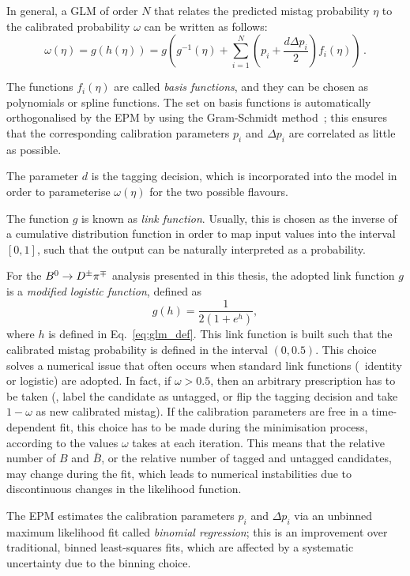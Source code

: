 In general, a GLM of order $N$ that relates the predicted mistag probability $\eta$ to the 
calibrated probability $\omega$ can be written as follows:
\begin{equation}
  \label{eq:glm_def}
  \omega(\eta) = g(h(\eta)) = g \left( g^{-1} (\eta) + \sum\limits_{i=1}^{N} \left(p_i + \frac{d\Delta p_i}{2}\right)f_i(\eta)\right)\,.
\end{equation}

The functions $f_i(\eta)$ are called \emph{basis functions}, and they can be chosen as polynomials or spline functions.
The set on basis functions is automatically orthogonalised by the EPM by using the Gram-Schmidt method~\cite{gram-schmidt}; this ensures that
the corresponding calibration parameters $p_i$ and $\Delta p_i$ are correlated as little as possible.

The parameter $d$ is the tagging decision, which is incorporated into the model in order to parameterise $\omega(\eta)$ for the two possible flavours.

The function $g$ is known as \emph{link function}. Usually, this is chosen as the inverse of a cumulative distribution
function in order to map input values into the interval $[0,1]$, such that the output can be naturally
interpreted as a probability.

For the $B^0\rightarrow D^\pm\pi^\mp$ analysis presented in this thesis, the adopted link function $g$ is a \emph{modified logistic function}, defined as
\begin{equation}
  \label{eq:rlogit}
  g(h) = \frac{1}{2(1+e^h)},
\end{equation}
where $h$ is defined in Eq.~\ref{eq:glm_def}. This link function is built such that the calibrated mistag probability
is defined in the interval $(0,0.5)$. This choice solves a numerical issue that often occurs when
standard link functions (\eg~identity or logistic) are adopted. In fact, if $\omega>0.5$, then an arbitrary
prescription has to be taken (\eg, label the candidate as untagged, or flip the tagging decision and take $1-\omega$ as
new calibrated mistag). If the calibration parameters are free in a time-dependent fit, this choice has to be made
during the minimisation process, according to the values $\omega$ takes at each iteration. This means that the relative
number of $B$ and $\bar B$, or the relative number of tagged and untagged candidates, may change during the fit, which
leads to numerical instabilities due to discontinuous changes in the likelihood function.

The EPM estimates the calibration parameters $p_i$ and $\Delta p_i$ via an unbinned maximum likelihood fit
called \emph{binomial regression}; this is an improvement over traditional, binned least-squares
fits, which are affected by a systematic uncertainty due to the binning choice.

